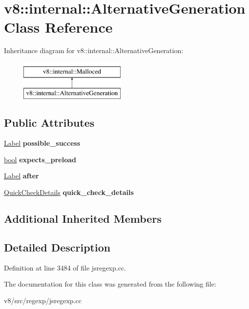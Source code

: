 \hypertarget{classv8_1_1internal_1_1AlternativeGeneration}{}\section{v8\+:\+:internal\+:\+:Alternative\+Generation Class Reference}
\label{classv8_1_1internal_1_1AlternativeGeneration}
Inheritance diagram for v8\+:\+:internal\+:\+:Alternative\+Generation\+:\begin{figure}[H]
\begin{center}
\leavevmode
\includegraphics[height=2.000000cm]{classv8_1_1internal_1_1AlternativeGeneration}
\end{center}
\end{figure}
\subsection*{Public Attributes}
\begin{DoxyCompactItemize}
\item 
\mbox{\label{classv8_1_1internal_1_1AlternativeGeneration_a6b2881c2cd1292cb0423fd4dab2ca823}} 
\mbox{\hyperlink{classv8_1_1internal_1_1Label}{Label}} {\bfseries possible\+\_\+success}
\item 
\mbox{\label{classv8_1_1internal_1_1AlternativeGeneration_a71eb17f16f4e5201f9f251c9fe74a507}} 
\mbox{\hyperlink{classbool}{bool}} {\bfseries expects\+\_\+preload}
\item 
\mbox{\label{classv8_1_1internal_1_1AlternativeGeneration_a5640bb3e3f745d0b4705cd21ae741361}} 
\mbox{\hyperlink{classv8_1_1internal_1_1Label}{Label}} {\bfseries after}
\item 
\mbox{\label{classv8_1_1internal_1_1AlternativeGeneration_a727fcad75b108bd5288f5771aae86831}} 
\mbox{\hyperlink{classv8_1_1internal_1_1QuickCheckDetails}{Quick\+Check\+Details}} {\bfseries quick\+\_\+check\+\_\+details}
\end{DoxyCompactItemize}
\subsection*{Additional Inherited Members}


\subsection{Detailed Description}


Definition at line 3484 of file jsregexp.\+cc.



The documentation for this class was generated from the following file\+:\begin{DoxyCompactItemize}
\item 
v8/src/regexp/jsregexp.\+cc\end{DoxyCompactItemize}
